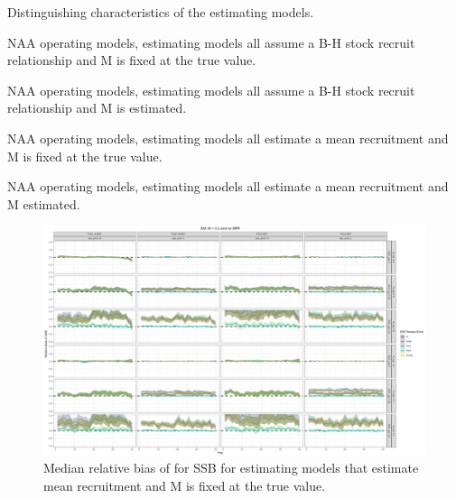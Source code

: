 \documentclass[
  12pt,
]{article}
\begin{document}
\begin{table}
\caption{Distinguishing characteristics of the estimating models.}
{\scriptsize }
\end{table}

\begin{table}
\caption{NAA operating models, estimating models all assume a B-H stock recruit relationship and M is fixed at the true value.}
{}
\end{table}

\begin{table}
\caption{NAA operating models, estimating models all assume a B-H stock recruit relationship and M is estimated.}
{}
\end{table}

\begin{table}
\caption{NAA operating models, estimating models all estimate a mean recruitment and M is fixed at the true value.}
{}
\end{table}

\begin{table}
\caption{NAA operating models, estimating models all estimate a mean recruitment and M estimated.}
{}
\end{table}
\clearpage

\begin{landscape}
\begin{figure}
\caption{Median relative bias of for SSB for estimating models that estimate mean recruitment and M is fixed at the true value.}\label{naa_om_em_R_MF_relbias_ssb}
\begin{center}
\includegraphics[width = \textwidth]{naa_om_R_MF_relbias_ssb.png}
\end{center}
\end{figure}
\end{landscape}
\end{document}
